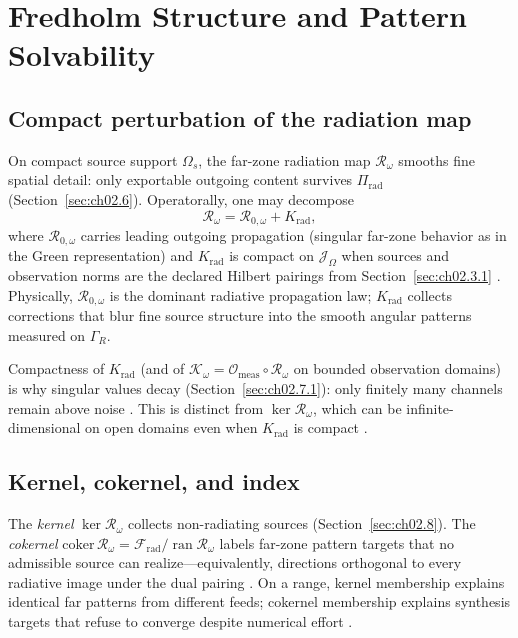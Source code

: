 
\section{Fredholm Structure and Pattern Solvability}
\label{sec:ch02.7c}

\subsection{Compact perturbation of the radiation map}
\label{sec:ch02.7c.1}

On compact source support $\Omega_s$, the far-zone radiation map $\mathcal{R}_\omega$ smooths fine spatial detail: only exportable outgoing content survives $\Pi_{\mathrm{rad}}$ (Section~\ref{sec:ch02.6}). Operatorally, one may decompose
\begin{equation}
\label{eq:ch2.radiation-fredholm-decomposition}
\mathcal{R}_\omega
=
\mathcal{R}_{0,\omega}+K_{\mathrm{rad}},
\end{equation}
where $\mathcal{R}_{0,\omega}$ carries leading outgoing propagation (singular far-zone behavior as in the Green representation) and $K_{\mathrm{rad}}$ is compact on $\mathcal{J}_\Omega$ when sources and observation norms are the declared Hilbert pairings from Section~\ref{sec:ch02.3.1} \cite{stratton1941,harrington2001}. Physically, $\mathcal{R}_{0,\omega}$ is the dominant radiative propagation law; $K_{\mathrm{rad}}$ collects corrections that blur fine source structure into the smooth angular patterns measured on $\Gamma_R$.

Compactness of $K_{\mathrm{rad}}$ (and of $\mathcal{K}_\omega=\mathcal{O}_{\mathrm{meas}}\circ\mathcal{R}_\omega$ on bounded observation domains) is why singular values decay (Section~\ref{sec:ch02.7.1}): only finitely many channels remain above noise \cite{chu1948,hansen1988}. This is distinct from $\ker\mathcal{R}_\omega$, which can be infinite-dimensional on open domains even when $K_{\mathrm{rad}}$ is compact \cite{devaney2004}.

\subsection{Kernel, cokernel, and index}
\label{sec:ch02.7c.2}

The \emph{kernel} $\ker\mathcal{R}_\omega$ collects non-radiating sources (Section~\ref{sec:ch02.8}). The \emph{cokernel} $\mathrm{coker}\,\mathcal{R}_\omega=\mathcal{F}_{\mathrm{rad}}/\operatorname{ran}\mathcal{R}_\omega$ labels far-zone pattern targets that no admissible source can realize---equivalently, directions orthogonal to every radiative image under the dual pairing \cite{stratton1941}. On a range, kernel membership explains identical far patterns from different feeds; cokernel membership explains synthesis targets that refuse to converge despite numerical effort \cite{harrington2001,devaney2004}.

